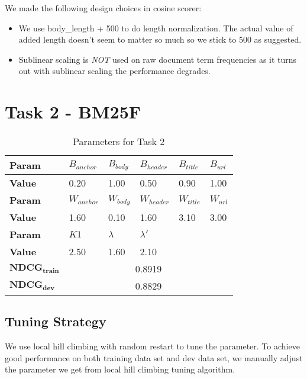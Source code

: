\documentclass{article}
\begin{document}
We made the following design choices in cosine scorer:

\begin{itemize}
    \item We use body\_length + 500 to do length normalization. The actual value of added length doesn't seem to matter so much so we stick to 500 as suggested.
    \item Sublinear scaling is \emph{NOT} used on raw document term frequencies as it turns out with sublinear scaling the performance degrades.
\end{itemize}

\section{Task 2 - BM25F}

\begin{table}[!htb]
  \centering
  \begin{tabular}{ | l | l | l | l | l | l |}
    \hline
    \textbf{Param} & $B_{anchor}$ & $B_{body}$ & $B_{header}$ & $B_{title}$ & $B_{url}$ \\
    \hline
    \textbf{Value} & 0.20 & 1.00 & 0.50 & 0.90 & 1.00 \\
    \hline
    \textbf{Param} & $W_{anchor}$ & $W_{body}$ & $W_{header}$ & $W_{title}$ & $W_{url}$ \\
    \hline
    \textbf{Value} & 1.60 & 0.10 & 1.60 & 3.10 & 3.00 \\
    \hline
    \textbf{Param} & $K1$ & $\lambda$ & $\lambda'$ & \multicolumn{2}{c|}{} \\
    \hline
    \textbf{Value} & 2.50 & 1.60 & 2.10 & \multicolumn{2}{c|}{}\\
    \hline
    $\mathbf{NDCG_{train}}$ & \multicolumn{5}{c|}{0.8919} \\
    \hline
    $\mathbf{NDCG_{dev}}$ & \multicolumn{5}{c|}{0.8829} \\
    \hline
  \end{tabular}
  \caption{Parameters for Task 2}
\end{table}

\subsection{Tuning Strategy}

We use local hill climbing with random restart to tune the parameter. To achieve good performance on both training data set and dev data set, we manually adjust the parameter we get from local hill climbing tuning algorithm.
\end{document}
